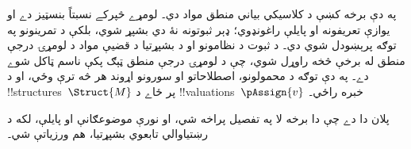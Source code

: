 \documentclass[../../include/open-logic-part]{subfiles}
\begin{document}

\begin{editorial}
  په دې برخه کښې د کلاسيکي بياني منطق مواد دي۔ لومړے څپرکے
  نسبتاً بنسټيز دے او يوازې تعريفونه او پايلې راغونډوي؛ ډېر ثبوتونه
  نۀ دي بشپړ شوي، بلکې د تمرينونو په توګه پرېښودل شوي دي۔ د ثبوت د
  نظامونو او د بشپړتيا د قضيې مواد د لومړۍ درجې منطق له برخې څخه
  راوړل شوي، چې د لومړۍ درجې منطق ټېګ پکې ناسم ټاکل شوے دے۔ په دې
  توګه د
  محمولونو، اصطلاحاتو او سورونو اړوند هر څه ترې وځي، او د
  !!{structure}s~$\Struct{M}$ پر ځاے د
  !!{valuation}s~$\pAssign{v}$ خبره راځي۔

  پلان دا دے چې دا برخه لا په تفصيل پراخه شي، او نورې موضوعګانې او
  پايلې، لکه د رښتياوالي تابعوي بشپړتيا، هم ورزياتې شي۔
\end{editorial}










\OLEndPartHook
\end{document}
